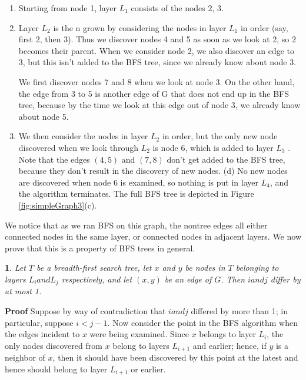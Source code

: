 \documentclass[12pt,a4paper]{book}
\newtheorem{lemma}{}[chapter]
\begin{document}
\begin{enumerate}
\item Starting from node 1, layer $L_{1}$ consists of the nodes {2, 3}.
\item Layer $L_{2}$ is the n grown by considering the nodes in layer $L_{1}$ in order (say, first 2, then 3). Thus we discover nodes 4 and 5 as soon as we look at 2, so 2 becomes their parent. When we consider node 2, we also discover an edge to 3, but this isn't added to the BFS tree, since we already know about node 3.\par
We first discover nodes 7 and 8 when we look at node 3. On the other hand, the edge from 3 to 5 is another edge of G that does not end up in the BFS tree, because by the time we look at this edge out of node 3, we already know about node 5.
\item We then consider the nodes in layer $L_{2}$ in order, but the only new node discovered when we look through $L_{2}$  is node 6, which is added to layer $L_{3}$ . Note that the edges $(4, 5)$ and $(7, 8)$ don't get added to the BFS tree, because they don't result in the discovery of new nodes.
(d) No new nodes are discovered when node 6 is examined, so nothing is put in layer $L_{4}$, and the algorithm terminates. The full BFS tree is depicted in Figure \ref{fig:simpleGraph3}(c).
\end{enumerate}
We notice that as we ran BFS on this graph, the nontree edges all either connected nodes in the same layer, or connected nodes in adjacent layers. We now prove that this is a property of BFS trees in general.
\begin{lemma}
Let $T$ be a breadth-first search tree, let $x$ and $y$ be nodes in $T$ belonging to layers $L_{i} and L_{j}$ respectively, and let $(x, y)$ be an edge of $G$. Then $i and j$ differ by at most 1.
\end{lemma}
\textbf{Proof} Suppose by way of contradiction that $i and j$ differed by more than 1; in particular, suppose $i < j − 1$. Now consider the point in the BFS algorithm when the edges incident to $x$ were being examined. Since $x$ belongs to layer $L_{i}$, the only nodes discovered from $x$ belong to layers $L_{i+1}$ and earlier; hence, if $y$ is a neighbor of $x$, then it should have been discovered by this point at the latest and hence should belong to layer $L_{i+1}$ or earlier.
\end{document}
